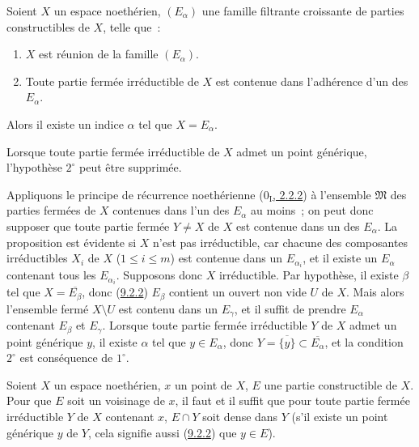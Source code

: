 \begin{corollary}[9.2.4]
\label{0.9.2.4-fr}
Soient $X$ un espace noethérien, $(E_\alpha)$ une famille filtrante
croissante de parties constructibles de $X$, telle que~:
\begin{enumerate}
  \item[$1^\circ$] $X$ est réunion de la famille $(E_\alpha)$.
  \item[$2^\circ$] Toute partie fermée irréductible de $X$ est contenue dans
    l'adhérence d'un des $E_\alpha$.
\end{enumerate}
Alors il existe un indice $\alpha$ tel que $X=E_\alpha$.

Lorsque toute partie fermée irréductible de $X$ admet un point générique,
l'hypothèse $2^\circ$ peut être supprimée.
\end{corollary}

Appliquons le principe de récurrence noethérienne
(\hyperref[0.2.2.2-fr]{$0_{\mathrm I}$, 2.2.2}) à l'ensemble
$\mathfrak{M}$ des parties fermées de $X$ contenues dans l'un des $E_\alpha$
au moins~; on peut donc supposer que toute partie fermée $Y\ne X$ de $X$ est
contenue dans un des $E_\alpha$. La proposition est évidente si $X$ n'est pas
irréductible, car chacune des composantes irréductibles $X_i$ de $X$
($1\leq i\leq m$) est contenue dans un $E_{\alpha_i}$, et il existe un
$E_\alpha$ contenant tous les $E_{\alpha_i}$. Supposons donc $X$
irréductible. Par hypothèse, il existe $\beta$ tel que
$X=\overline{E_\beta}$, donc (\hyperref[0.9.2.2-fr]{9.2.2}) $E_\beta$
contient un ouvert non vide $U$ de $X$. Mais alors l'ensemble fermé
$X\setminus U$ est contenu dans un $E_\gamma$, et il suffit de prendre
$E_\alpha$ contenant $E_\beta$ et $E_\gamma$. Lorsque toute partie fermée
irréductible $Y$ de $X$
admet un point générique $y$, il existe $\alpha$ tel que $y\in E_\alpha$,
donc $Y=\overline{\{y\}}\subset\overline{E_\alpha}$, et la condition
$2^\circ$ est conséquence de $1^\circ$.

\begin{proposition}[9.2.5]
\label{0.9.2.5-fr}
Soient $X$ un espace noethérien, $x$ un point de $X$, $E$ une partie
constructible de $X$. Pour que $E$ soit un voisinage de $x$, il faut et il
suffit que pour toute partie fermée irréductible $Y$ de $X$ contenant $x$,
$E\cap Y$ soit dense dans $Y$ (s'il existe un point générique $y$ de $Y$,
cela signifie aussi (\hyperref[0.9.2.2-fr]{9.2.2}) que $y\in E$).
\end{proposition}

